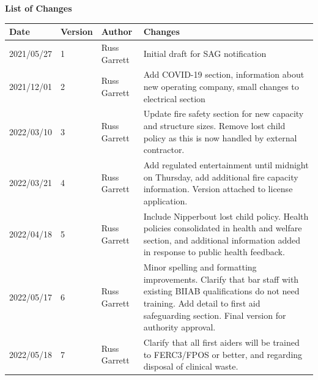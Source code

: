 \begin{titlepage}
\begin{center}
    \textbf{List of Changes}
    \begin{tabular}{l | l | l | p{9cm}}
      Date & Version & Author & Changes \\
      \hline
      2021/05/27 & 1 & Russ Garrett & Initial draft for SAG notification \\
      2021/12/01 & 2 & Russ Garrett & Add COVID-19 section, information about new operating company, small changes to electrical section \\
      2022/03/10 & 3 & Russ Garrett & Update fire safety section for new capacity and structure sizes. Remove lost child policy as this
                                      is now handled by external contractor. \\
      2022/03/21 & 4 & Russ Garrett & Add regulated entertainment until midnight on Thursday, add additional fire capacity information.
                                      Version attached to license application. \\
      2022/04/18 & 5 & Russ Garrett & Include Nipperbout lost child policy. Health policies consolidated in health and welfare section,
                                        and additional information added in response to public health feedback. \\
      2022/05/17 & 6 & Russ Garrett & Minor spelling and formatting improvements. Clarify that bar staff with existing BIIAB qualifications
                                        do not need training. Add detail to first aid safeguarding section.
                                        Final version for authority approval. \\
      2022/05/18 & 7 & Russ Garrett & Clarify that all first aiders will be trained to FERC3/FPOS or better, and regarding disposal of clinical
                                        waste. \\
    \end{tabular}
\end{center}
\end{titlepage}
\setcounter{page}{2}

\tableofcontents

\newpage



